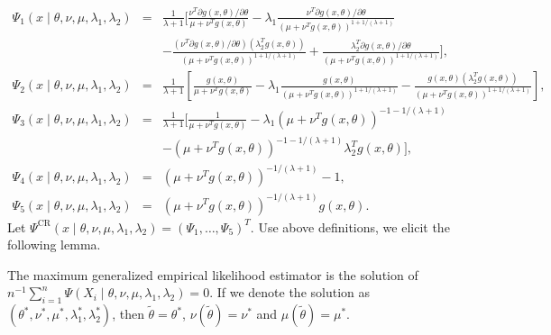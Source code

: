 \begin{eqnarray*}
\Psi_{1}\left(x\mid\theta,\nu,\mu,\lambda_{1},\lambda_{2}\right) & = & \frac{1}{\lambda+1}\Bigg[\frac{\nu^{T}\partial g\left(x,\theta\right)/\partial\theta}{\mu+\nu^{T}g\left(x,\theta\right)}-\lambda_{1}\frac{\nu^{T}\partial g\left(x,\theta\right)/\partial\theta}{\left(\mu+\nu^{T}g\left(x,\theta\right)\right)^{1+1/\left(\lambda+1\right)}}\\
 &  & -\frac{\left(\nu^{T}\partial g\left(x,\theta\right)/\partial\theta\right)\left(\lambda_{2}^{T}g\left(x,\theta\right)\right)}{\left(\mu+\nu^{T}g\left(x,\theta\right)\right)^{1+1/\left(\lambda+1\right)}}+\frac{\lambda_{2}^{T}\partial g\left(x,\theta\right)/\partial\theta}{\left(\mu+\nu^{T}g\left(x,\theta\right)\right)^{1+1/\left(\lambda+1\right)}}\Bigg],\\
\Psi_{2}\left(x\mid\theta,\nu,\mu,\lambda_{1},\lambda_{2}\right) & = & \frac{1}{\lambda+1}\left[\frac{g\left(x,\theta\right)}{\mu+\nu^{T}g\left(x,\theta\right)}-\lambda_{1}\frac{g\left(x,\theta\right)}{\left(\mu+\nu^{T}g\left(x,\theta\right)\right)^{1+1/\left(\lambda+1\right)}}-\frac{g\left(x,\theta\right)\left(\lambda_{2}^{T}g\left(x,\theta\right)\right)}{\left(\mu+\nu^{T}g\left(x,\theta\right)\right)^{1+1/\left(\lambda+1\right)}}\right],\\
\Psi_{3}\left(x\mid\theta,\nu,\mu,\lambda_{1},\lambda_{2}\right) & = & \frac{1}{\lambda+1}\Bigg[\frac{1}{\mu+\nu^{T}g\left(x,\theta\right)}-\lambda_{1}\left(\mu+\nu^{T}g\left(x,\theta\right)\right)^{-1-1/\left(\lambda+1\right)}\\
 &  & -\left(\mu+\nu^{T}g\left(x,\theta\right)\right)^{-1-1/\left(\lambda+1\right)}\lambda_{2}^{T}g\left(x,\theta\right)\Bigg],\\
\Psi_{4}\left(x\mid\theta,\nu,\mu,\lambda_{1},\lambda_{2}\right) & = & \left(\mu+\nu^{T}g\left(x,\theta\right)\right)^{-1/\left(\lambda+1\right)}-1,\\
\Psi_{5}\left(x\mid\theta,\nu,\mu,\lambda_{1},\lambda_{2}\right) & = & \left(\mu+\nu^{T}g\left(x,\theta\right)\right)^{-1/\left(\lambda+1\right)}g\left(x,\theta\right).
\end{eqnarray*}
Let $\Psi^{\mathrm{CR}}\left(x\mid\theta,\nu,\mu,\lambda_{1},\lambda_{2}\right)=\left(\Psi_{1},\ldots,\Psi_{5}\right)^{T}$.
Use above definitions, we elicit the following lemma.
\begin{lem}
\label{lem:extend-m-estimator}The  maximum generalized empirical
likelihood estimator is the solution of $n^{-1}\sum_{i=1}^{n}\Psi\left(X_{i}\mid\theta,\nu,\mu,\lambda_{1},\lambda_{2}\right)=0$.
If we denote the solution as $\left(\theta^{*},\nu^{*},\mu^{*},\lambda_{1}^{*},\lambda_{2}^{*}\right)$,
then $\tilde{\theta}=\theta^{*}$, $\nu\left(\tilde{\theta}\right)=\nu^{*}$
and $\mu\left(\tilde{\theta}\right)=\mu^{*}$.\end{lem}
